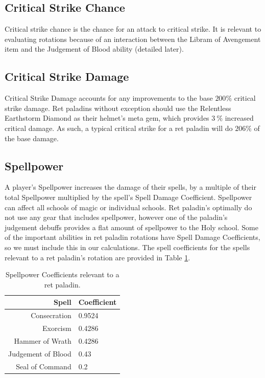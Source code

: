 \documentclass[letterpaper,11pt]{article}
\begin{document}
	\subsection{Critical Strike Chance}
	Critical strike chance is the chance for an attack to critical strike.
	It is relevant to evaluating rotations because of an interaction between the Libram of Avengement item and the Judgement of Blood ability (detailed later).
		
	\subsection{Critical Strike Damage}
	Critical Strike Damage accounts for any improvements to the base $200\%$ critical strike damage.
	Ret paladins without exception should use the Relentless Earthstorm Diamond as their helmet's meta gem, which provides $3~\%$ increased critical damage.
	As such, a typical critical strike for a ret paladin will do $206\%$ of the base damage.
	
	\subsection{Spellpower}
	A player's Spellpower increases the damage of their spells, by a multiple of their total Spellpower multiplied by the spell's Spell Damage Coefficient.
	Spellpower can affect all schools of magic or individual schools.
	Ret paladin's optimally do not use any gear that includes spellpower, however one of the paladin's judgement debuffs provides a flat amount of spellpower to the Holy school.
	Some of the important abilities in ret paladin rotations have Spell Damage Coefficients, so we must include this in our calculations.
	The spell coefficients for the spells relevant to a ret paladin's rotation are provided in Table \ref{tab:spellcoefficients}.
	
	\begin{table}[htb]
		\centering
		\begin{tabular}{r | l}
			Spell & Coefficient \\
			\hline \hline
			Consecration & 0.9524 \\
			Exorcism & 0.4286 \\
			Hammer of Wrath & 0.4286 \\
			Judgement of Blood & 0.43 \\
			Seal of Command & 0.2 \\
			\hline
		\end{tabular}
		\caption{Spellpower Coefficients relevant to a ret paladin.}		
		\label{tab:spellcoefficients}
	\end{table}
	
\end{document}
